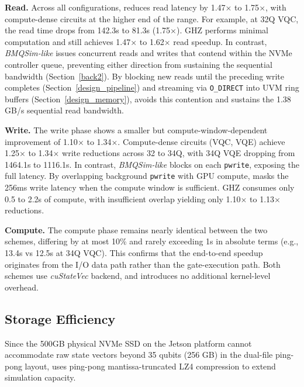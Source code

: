 \noindent\textbf{Read.} Across all configurations, \EdgeQuantum reduces read latency by 1.47$\times$ to 1.75$\times$, with compute-dense circuits at the higher end of the range. For example, at 32Q VQC, the read time drops from 142.3s to 81.3s (1.75$\times$). GHZ performs minimal computation and still achieves 1.47$\times$ to 1.62$\times$ read speedup. In contrast, \textit{BMQSim-like} issues concurrent reads and writes that contend within the NVMe controller queue, preventing either direction from sustaining the sequential bandwidth (Section~\ref{back2}). By blocking new reads until the preceding write completes (Section~\ref{design_pipeline}) and streaming via \texttt{O\_DIRECT} into UVM ring buffers (Section~\ref{design_memory}), \EdgeQuantum avoids this contention and sustains the 1.38 GB/s sequential read bandwidth.


\noindent\textbf{Write.} The write phase shows a smaller but compute-window-dependent improvement of 1.10$\times$ to 1.34$\times$. Compute-dense circuits (VQC, VQE) achieve 1.25$\times$ to 1.34$\times$ write reductions across 32 to 34Q, with 34Q VQE dropping from 1464.1s to 1116.1s. In contrast, \textit{BMQSim-like} blocks on each \texttt{pwrite}, exposing the full latency. By overlapping background \texttt{pwrite} with GPU compute, \EdgeQuantum masks the 256ms write latency when the compute window is sufficient. GHZ consumes only 0.5 to 2.2s of compute, with insufficient overlap yielding only 1.10$\times$ to 1.13$\times$ reductions. 

\noindent\textbf{Compute.} The compute phase remains nearly identical between the two schemes, differing by at most 10\% and rarely exceeding 1s in absolute terms (e.g., 13.4s vs 12.5s at 34Q VQC). This confirms that the end-to-end speedup originates from the I/O data path rather than the gate-execution path. Both schemes use \textit{cuStateVec} backend, and \EdgeQuantum introduces no additional kernel-level overhead.


\subsection{Storage Efficiency}\label{sec:storage_eff}



Since the 500GB physical NVMe SSD on the Jetson platform cannot accommodate raw state vectors beyond 35 qubits (256 GB) in the dual-file ping-pong layout, \EdgeQuantum uses ping-pong mantissa-truncated LZ4 compression to extend simulation capacity.

